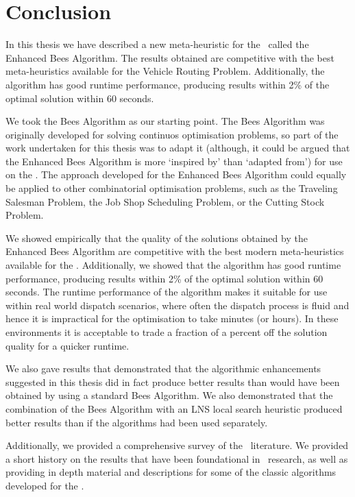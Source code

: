 
\chapter{Conclusion}
\label{chap:conclusion}

In this thesis we have described a new meta-heuristic for the \VRP\ called the Enhanced Bees Algorithm. The results obtained are competitive with the best meta-heuristics available for the Vehicle Routing Problem. Additionally, the algorithm has good runtime performance, producing results within 2\% of the optimal solution within 60 seconds.

We took the Bees Algorithm as our starting point. The Bees Algorithm was originally developed for solving continuos optimisation problems, so part of the work undertaken for this thesis was to adapt it (although, it could be argued that the Enhanced Bees Algorithm is more `inspired by' than `adapted from') for use on the \VRP. The approach developed for the Enhanced Bees Algorithm could equally be applied to other combinatorial optimisation problems, such as the Traveling Salesman Problem, the Job Shop Scheduling Problem, or the Cutting Stock Problem.

We showed empirically that the quality of the solutions obtained by the Enhanced Bees Algorithm are competitive with the best modern meta-heuristics available for the \VRP. Additionally, we showed that the algorithm has good runtime performance, producing results within 2\% of the optimal solution within 60 seconds. The runtime performance of the algorithm makes it suitable for use within real world dispatch scenarios, where often the dispatch process is fluid and hence it is impractical for the optimisation to take minutes (or hours). In these environments it is acceptable to trade a fraction of a percent off the solution quality for a quicker runtime.

We also gave results that demonstrated that the algorithmic enhancements suggested in this thesis did in fact produce better results than would have been obtained by using a standard Bees Algorithm. We also demonstrated that the combination of the Bees Algorithm with an LNS local search heuristic produced better results than if the algorithms had been used separately.

Additionally, we provided a comprehensive survey of the \VRP\ literature. We provided a short history on the results that have been foundational in \VRP\ research, as well as providing in depth material and descriptions for some of the classic algorithms developed for the \VRP. 

